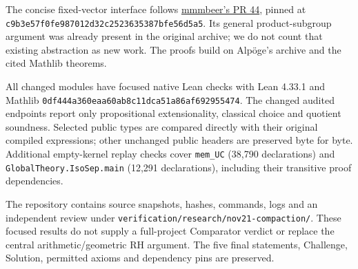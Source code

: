 \documentclass[11pt]{article}
\newcommand{\src}[1]{\nolinkurl{#1}}
\begin{document}
The concise fixed-vector interface follows
\href{https://github.com/leanprover-community/riemann-hypothesis/pull/44}{mmmbeer's PR 44},
pinned at \src{c9b3e57f0fe987012d32c2523635387bfe56d5a5}. Its general
product-subgroup argument was already present in the original archive;
we do not count that existing abstraction as new work. The proofs build on
Alp\"oge's archive and the cited Mathlib theorems.

All changed modules have focused native Lean checks with Lean 4.33.1 and
Mathlib \src{0df444a360eaa60ab8c11dca51a86af692955474}.
The changed audited endpoints report only propositional extensionality,
classical choice and quotient soundness. Selected public types are compared
directly with their original compiled expressions; other unchanged public
headers are preserved byte for byte. Additional empty-kernel replay checks
cover \src{mem_UC} (38,790 declarations) and \src{GlobalTheory.IsoSep.main}
(12,291 declarations), including their transitive proof dependencies.

The repository contains source snapshots, hashes, commands, logs and an
independent review under \src{verification/research/nov21-compaction/}.
These focused results do not supply a full-project Comparator verdict or
replace the central arithmetic/geometric RH argument. The five final
statements, Challenge, Solution, permitted axioms and dependency pins are
preserved.
\end{document}
